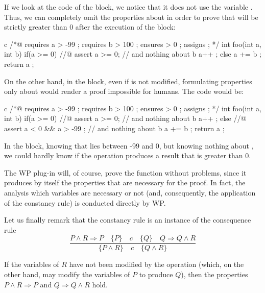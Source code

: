 If we look at the code of the  block, we notice that it does
not use the variable . Thus, we can completely omit the
properties about  in order to prove that  will be
strictly greater than 0 after the execution of the block:



\begin{CodeBlock}{c}
/*@
  requires a > -99 ;
  requires b > 100 ;
  ensures  \result > 0 ;
  assigns  \nothing ;
*/
int foo(int a, int b){
  if(a >= 0){
    //@ assert a >= 0; // and nothing about b
    a++ ;
  } else {
    a += b ;
  }
  return a ;
}
\end{CodeBlock}



On the other hand, in the  block, even if  is
not modified, formulating properties only about  would render
a proof impossible for humans. The code would be:



\begin{CodeBlock}{c}
/*@
  requires a > -99 ;
  requires b > 100 ;
  ensures  \result > 0 ;
  assigns  \nothing ;
*/
int foo(int a, int b){
  if(a >= 0){
    //@ assert a >= 0; // and nothing about b
    a++ ;
  } else {
    //@ assert a < 0 && a > -99 ; // and nothing about b
    a += b ;
  }
  return a ;
}
\end{CodeBlock}



In the  block, knowing that lies between -99 and
0, but knowing nothing about , we could hardly know if the
operation  produces a result that is greater than 0.

The WP plug-in will, of course, prove the function without problems,
since it produces by itself the properties that are necessary for the
proof. In fact, the analysis which variables are necessary or not (and,
consequently, the application of the constancy rule) is conducted
directly by WP.

Let us finally remark that the constancy rule is an instance of the
consequence rule
$$\dfrac{P \wedge R \Rightarrow P \quad \{P\}\quad c\quad \{Q\} \quad Q \Rightarrow Q \wedge R}{\{P \wedge R\}\quad c\quad \{Q \wedge R\}}$$


If the variables of $R$ have not been modified by the operation
(which, on the other hand, may modify the variables of $P$ to produce
$Q$), then the properties $P \wedge R \Rightarrow P$ and
$Q \Rightarrow Q \wedge R$ hold.



